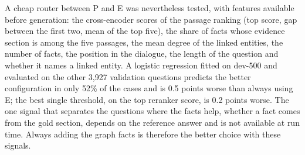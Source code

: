 A cheap router between P and E was nevertheless tested, with features available before
generation: the cross-encoder scores of the passage ranking (top score, gap between the
first two, mean of the top five), the share of facts whose evidence section is among the
five passages, the mean degree of the linked entities, the number of facts, the position
in the dialogue, the length of the question and whether it names a linked entity. A
logistic regression fitted on dev-500 and evaluated on the other 3{,}927 validation
questions predicts the better configuration in only 52\% of the cases and is 0.5 points
worse than always using E; the best single threshold, on the top reranker score, is 0.2
points worse. The one signal that separates the questions where the facts help, whether a
fact comes from the gold section, depends on the reference answer and is not available at
run time. Always adding the graph facts is therefore the better choice with these signals.
